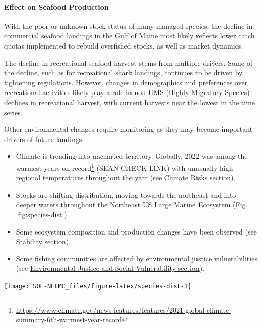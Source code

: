 \documentclass[
  10pt,
]{article}
\providecommand{\tightlist}{%
  \setlength{\itemsep}{0pt}\setlength{\parskip}{0pt}}
\let\origfigure\figure
\let\endorigfigure\endfigure
\renewenvironment{figure}[1][2] {
    \expandafter\origfigure\expandafter[H]
} {
    \endorigfigure
}
\begin{document}
\hypertarget{effect-on-seafood-production}{%
\paragraph{Effect on Seafood Production}\label{effect-on-seafood-production}}

With the poor or unknown stock status of many managed species, the decline in commercial seafood landings in the Gulf of Maine most likely reflects lower catch quotas implemented to rebuild overfished stocks, as well as market dynamics.

The decline in recreational seafood harvest stems from multiple drivers. Some of the decline, such as for recreational shark landings, continues to be driven by tightening regulations. However, changes in demographics and preferences over recreational activities likely play a role in non-HMS (Highly Migratory Species) declines in recreational harvest, with current harvests near the lowest in the time series.

Other environmental changes require monitoring as they may become important drivers of future landings:

\begin{itemize}
\tightlist
\item
  Climate is trending into uncharted territory. Globally, 2022 was among the warmest years on record\footnote{\url{https://www.climate.gov/news-features/features/2021-global-climate-summary-6th-warmest-year-record}} (SEAN CHECK LINK) with unusually high regional temperatures throughout the year (see \protect\hyperlink{climate-and-ecosystem-productivity}{Climate Risks section}).
\item
  Stocks are shifting distribution, moving towards the northeast and into deeper waters throughout the Northeast US Large Marine Ecosystem (Fig. \ref{fig:species-dist}).
\item
  Some ecosystem composition and production changes have been observed (see \protect\hyperlink{stability}{Stability section}).
\item
  Some fishing communities are affected by environmental justice vulnerabilities (see \protect\hyperlink{social-vulnerability}{Environmental Justice and Social Vulnerability section}).
\end{itemize}

\begin{figure}

{\centering \texttt{[image: SOE-NEFMC\_files/figure-latex/species-dist-1]} 

}

\caption{Aggregate species distribution metrics for species in the Northeast Large Marine Ecosystem.}\label{fig:species-dist}
\end{figure}
\end{document}
